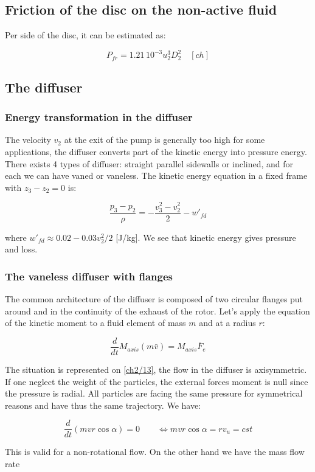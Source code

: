 \subsection{Friction of the disc on the non-active fluid}
Per side of the disc, it can be estimated as: 

\begin{equation}
P_{fr} = 1.21 \, 10^{-3} u_2^3 D_2^2 \quad [ch]
\end{equation}

\subsection{The diffuser}
\subsubsection{Energy transformation in the diffuser}
The velocity $v_2$ at the exit of the pump is generally too high for some applications, the diffuser converts part of the kinetic energy into pressure energy. There exists 4 types of diffuser: straight parallel sidewalls or inclined, and for each we can have vaned or vaneless. The kinetic energy equation in a fixed frame with $z_3 - z_2 = 0$ is: 

\begin{equation}
\frac{p_3-p_2}{\rho} = -\frac{v_3^2-v_2^2}{2} -w'_{fd}
\end{equation}

where $w'_{fd}\approx 0.02 - 0.03 v^2_2/2$ [J/kg]. We see that kinetic energy gives pressure and loss. 

\subsubsection{The vaneless diffuser with flanges} 
The common architecture of the diffuser is composed of two circular flanges put around and in the continuity of the exhaust of the rotor. Let's apply the equation of the kinetic moment to a fluid element of mass $m$ and at a radius $r$: 

\begin{equation}
\frac{d}{dt} M_{axis}(m\bar{v}) = M_{axis} \bar{F}_e
\end{equation}

The situation is represented on \autoref{ch2/13}, the flow in the diffuser is axisymmetric. If one neglect the weight of the particles, the external forces moment is null since the pressure is radial. All particles are facing the same pressure for symmetrical reasons and have thus the same trajectory. We have: 

\begin{equation}
\frac{d}{dt} (mvr\cos \alpha) = 0 \qquad \Leftrightarrow mvr\cos \alpha = rv_u = cst
\end{equation}

This is valid for a non-rotational flow. On the other hand we have the mass flow rate 